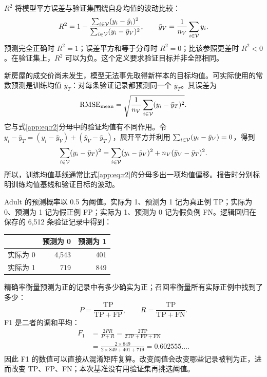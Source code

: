 $R^2$ 将模型平方误差与验证集围绕自身均值的波动比较：
\begin{equation}\label{app:eq:r2}
R^2=1-\frac{\sum_{i\in\mathcal{V}}(y_i-\hat y_i)^2}
{\sum_{i\in\mathcal{V}}(y_i-\bar y_V)^2},\qquad
\bar y_V=\frac1{n_V}\sum_{i\in\mathcal{V}}y_i.
\end{equation}
预测完全正确时 $R^2=1$；误差平方和等于分母时 $R^2=0$；比该参照更差时 $R^2<0$。在验证集上，$R^2$ 可以为负。这个定义要求验证目标并非全部相同。

新房屋的成交价尚未发生，模型无法事先取得新样本的目标均值。可实际使用的常数预测是训练均值 $\bar y_T$：对每条验证记录都预测同一个 $\bar y_T$。其误差为
\[
\operatorname{RMSE}_{\mathrm{mean}}=
\sqrt{\frac1{n_V}\sum_{i\in\mathcal{V}}(y_i-\bar y_T)^2}.
\]
它与式\eqref{app:eq:r2}分母中的验证均值有不同作用。令 $y_i-\bar y_T=(y_i-\bar y_V)+(\bar y_V-\bar y_T)$，展开平方并利用 $\sum_{i\in\mathcal{V}}(y_i-\bar y_V)=0$，得到
\begin{equation}
\sum_{i\in\mathcal{V}}(y_i-\bar y_T)^2
=\sum_{i\in\mathcal{V}}(y_i-\bar y_V)^2+n_V(\bar y_V-\bar y_T)^2.
\end{equation}
所以，训练均值基线通常比式\eqref{app:eq:r2}的分母多出一项均值偏移。报告时分别标明训练均值基线和验证目标的波动。

Adult 的预测概率以 0.5 为阈值。实际为 1、预测为 1 记为真正例 TP；实际为 0、预测为 1 记为假正例 FP；实际为 1、预测为 0 记为假负例 FN。逻辑回归在保存的 6,512 条验证记录中得到：
\begin{center}
\begin{tabular}{lrr}
\toprule
 & 预测为 0 & 预测为 1\\
\midrule
实际为 0 & 4,543 & 401\\
实际为 1 & 719 & 849\\
\bottomrule
\end{tabular}
\end{center}
精确率衡量预测为正的记录中有多少确实为正；召回率衡量所有实际正例中找到了多少：
\begin{equation}
P=\frac{\mathrm{TP}}{\mathrm{TP}+\mathrm{FP}},\qquad
R=\frac{\mathrm{TP}}{\mathrm{TP}+\mathrm{FN}}.
\end{equation}
F1 是二者的调和平均：
\begin{align}
F_1&=\frac{2PR}{P+R}
=\frac{2\mathrm{TP}}{2\mathrm{TP}+\mathrm{FP}+\mathrm{FN}}\\
&=\frac{2\times849}{2\times849+401+719}
=0.602555\ldots.
\end{align}
因此 F1 的数值可以直接从混淆矩阵复算。改变阈值会改变哪些记录被判为正，进而改变 TP、FP、FN；本次基准没有用验证集再挑选阈值。

